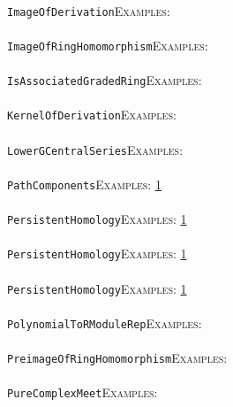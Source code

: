 \documentclass[a4paper,11pt]{report}
\begin{document}
{{ \\
 \texttt{ImageOfDerivation}{\nobreakspace}{\nobreakspace}{\nobreakspace}{\nobreakspace}\textsc{Examples:} \\
 \\
 \texttt{ImageOfRingHomomorphism}{\nobreakspace}{\nobreakspace}{\nobreakspace}{\nobreakspace}\textsc{Examples:} \\
 \\
 \texttt{IsAssociatedGradedRing}{\nobreakspace}{\nobreakspace}{\nobreakspace}{\nobreakspace}\textsc{Examples:} \\
 \\
 \texttt{KernelOfDerivation}{\nobreakspace}{\nobreakspace}{\nobreakspace}{\nobreakspace}\textsc{Examples:} \\
 \\
 \texttt{LowerGCentralSeries}{\nobreakspace}{\nobreakspace}{\nobreakspace}{\nobreakspace}\textsc{Examples:} \\
 \\
 \texttt{PathComponents}{\nobreakspace}{\nobreakspace}{\nobreakspace}{\nobreakspace}\textsc{Examples:} \href{../www/SideLinks/About/aboutQuandles.html} {1}{\nobreakspace} \\
 \\
 \texttt{PersistentHomology}{\nobreakspace}{\nobreakspace}{\nobreakspace}{\nobreakspace}\textsc{Examples:} \href{../www/SideLinks/About/aboutPersistent.html} {1}{\nobreakspace} \\
 \\
 \texttt{PersistentHomology}{\nobreakspace}{\nobreakspace}{\nobreakspace}{\nobreakspace}\textsc{Examples:} \href{../www/SideLinks/About/aboutPersistent.html} {1}{\nobreakspace} \\
 \\
 \texttt{PersistentHomology}{\nobreakspace}{\nobreakspace}{\nobreakspace}{\nobreakspace}\textsc{Examples:} \href{../www/SideLinks/About/aboutPersistent.html} {1}{\nobreakspace} \\
 \\
 \texttt{PolynomialToRModuleRep}{\nobreakspace}{\nobreakspace}{\nobreakspace}{\nobreakspace}\textsc{Examples:} \\
 \\
 \texttt{PreimageOfRingHomomorphism}{\nobreakspace}{\nobreakspace}{\nobreakspace}{\nobreakspace}\textsc{Examples:} \\
 \\
 \texttt{PureComplexMeet}{\nobreakspace}{\nobreakspace}{\nobreakspace}{\nobreakspace}\textsc{Examples:} \\
}}
\end{document}

